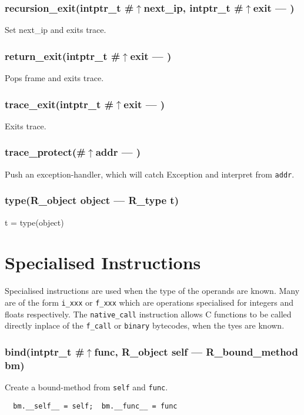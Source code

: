 \subsubsection{recursion\_exit(intptr\_t \#$\uparrow$next\_ip, intptr\_t \#$\uparrow$exit --- )}
\vspace{-1em}Set next\_ip and exits trace. \vspace{-1em}
\subsubsection{return\_exit(intptr\_t \#$\uparrow$exit --- )}
\vspace{-1em}Pops frame and exits trace. \vspace{-1em}
\subsubsection{trace\_exit(intptr\_t \#$\uparrow$exit --- )}
\vspace{-1em}Exits trace. \vspace{-1em}
\subsubsection{trace\_protect(\#$\uparrow$addr --- )}
\vspace{-1em}Push an exception-handler,  which will catch Exception and interpret from \texttt{addr}. \vspace{-1em}
\subsubsection{type(R\_object object --- R\_type t)}
\vspace{-1em}t = type(object) \vspace{-1em}
\section{Specialised Instructions}

    Specialised instructions are used when the type of the operands are known.
    Many are of the form \verb|i_xxx| or \verb|f_xxx| which are operations
    specialised for integers and floats respectively.
    The \verb|native_call| instruction allows C functions to be called directly 
    inplace of the \verb|f_call| or \verb|binary| bytecodes, when the tyes are known.
        
\subsubsection{bind(intptr\_t \#$\uparrow$func, R\_object self --- R\_bound\_method bm)}
\vspace{-1em}Create a bound-method from \texttt{self} and \texttt{func}. \vspace{-1em}\begin{verbatim}
  bm.__self__ = self;  bm.__func__ = func
\end{verbatim}
\vspace{-1em}\vspace{-1em}
